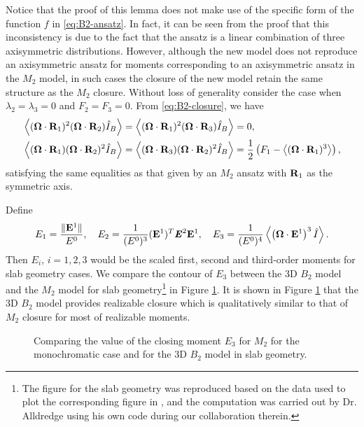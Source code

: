 Notice that the proof of this lemma does not make use of the
specific form of the function $f$ in \eqref{eq:B2-ansatz}. In fact,
it can be seen from the proof that this inconsistency is due to the 
fact that the ansatz is a linear combination of three axisymmetric 
distributions. However, although the new model does not reproduce an 
axisymmetric ansatz for moments corresponding
to an axisymmetric ansatz in the $M_2$ model,
in such cases the closure of the new model retain the same structure 
as the $M_2$ closure. Without loss of generality consider the case when
$\lambda_2 = \lambda_3 = 0$ and $F_2 = F_3 = 0$. From
\eqref{eq:B2-closure}, we have
\begin{equation}\label{eq:axisymmetric-structure}
  \begin{split}
    & \Vint{ (\bOmega\cdot\bR_1)^2 (\bOmega\cdot\bR_2) \bansatz } =
    \Vint{ (\bOmega\cdot\bR_1)^2 (\bOmega\cdot\bR_3) \bansatz } =
    0,\\
    & \Vint{ (\bOmega\cdot\bR_1) (\bOmega\cdot\bR_2)^2 \bansatz } =
    \Vint{ (\bOmega\cdot\bR_3) (\bOmega\cdot\bR_2)^2 \bansatz }
    = \dfrac12\left(F_1-\Vint{ (\bOmega\cdot\bR_1)^3 }\right),
  \end{split}
\end{equation}
satisfying the same equalities as that given by an $M_2$ ansatz with
$\mathbf{R}_1$ as the symmetric axis. 
 
Define
\[
  E_1 = \dfrac{\|\mathbf{E}^1\|}{E^0},\quad
  E_2 = \dfrac{1}{(E^0)^3} (\mathbf{E}^1)^T \boldsymbol{\mathit{E}}^2 \mathbf{E}^1, \quad
  E_3 = \dfrac{1}{(E^0)^4} \left\langle  \left(\boldsymbol{\Omega}\cdot\mathbf{E}^1\right)^3 
  \hat{I} \right\rangle.
\]
Then $E_i$, $i = 1,2,3$ would be the scaled first, second and
third-order moments for slab geometry cases. We compare the contour of
$E_3$ between the 3D $B_2$ model and the $M_2$ model for slab
geometry\footnote{The figure for the slab geometry was reproduced
  based on the data used to plot the corresponding figure in
  \cite{alldredge2016approximating}, and the computation was carried
  out by Dr. Alldredge using his own code during our collaboration
  therein.} in Figure \ref{fig:compare-contour}.  It is shown in
Figure \ref{fig:compare-contour} that the 3D $B_2$ model provides
realizable closure which is qualitatively similar to that of $M_2$
closure for most of realizable moments.
\begin{figure}
   \hfill
  \hfill
  \caption{Comparing the value of the closing moment $E_3$ for $M_2$
    for the monochromatic case and for the 3D $B_2$ model in slab
    geometry.}
  \label{fig:compare-contour}
\end{figure}

